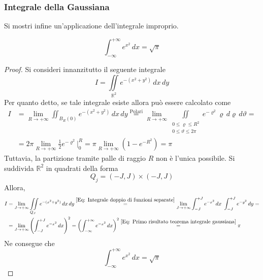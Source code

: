\subsubsection{Integrale della Gaussiana}
Si mostri infine un'applicazione dell'integrale improprio.
\begin{theorem}
    \begin{equation}
    \int_{-\infty}^{+\infty}{e^{x^2}}\, dx = \sqrt{\pi}
    \end{equation}
\end{theorem}
\begin{proof}
    Si consideri innanzitutto il seguente integrale
    \begin{equation}
        I=\iint\limits_{\mathbb{R}^2}{e^{-(x^2+y^2)}}\,dx\,dy
    \end{equation}
    Per quanto detto, se tale integrale esiste allora può essere calcolato come
    \begin{equation} \label{Eq: Primo risultato teorema integrale gaussiana}
    \begin{aligned}
        I&=\lim_{R \to +\infty}{\iint_{B_R(0)}{e^{-(x^2+y^2)}}}\,dx\,dy \overset{\text{Polari}}{=} \lim_{R \to +\infty}{\iint\limits_{\substack{0 \leq \varrho \leq R^2\\ 0 \leq \vartheta \leq 2\pi}}{e^{-\varrho^2} \varrho}\,d\varrho\,d\vartheta}=\\
        &= 2\pi \lim_{R \to +\infty}{\frac{1}{2}}{e^{-\varrho^2}\Big|_{0}^{R}}= \pi \lim_{R \to +\infty}{(1-e^{-R^2})}= \pi
    \end{aligned}
    \end{equation}
    Tuttavia, la partizione tramite palle di raggio $R$ non è l'unica possibile. Si suddivida $\mathbb{R}^2$ in quadrati della forma
    \begin{equation}
        Q_j=(-J,J) \times (-J, J)
    \end{equation}
    Allora, 
    \begin{equation}
    \begin{aligned}
        I&= \lim_{J \to +\infty}{\iint\limits_{Q_J}{e^{-(x^2+y^2)}}\,dx\,dy}\overset{\eqref{Eq: Integrale doppio di funzioni separate}}{=} \lim_{J \to +\infty}{\int_{-J}^{+J}{e^{-x^2}}\, dx\ \int_{-J}^{+J}{e^{-y^2}}\,dy}=\\
        &=\lim_{J \to + \infty}\left(\int_{-J}^{+J}{ e^{-x^2}}\,dx\right)^2 = \left(\int_{-\infty}^{+\infty}{ e^{-x^2}}\,dx\right)^2 \overset{\eqref{Eq: Primo risultato teorema integrale gaussiana}}{=} \pi
    \end{aligned}
    \end{equation}
    Ne consegue che
    \begin{equation}
        \int_{-\infty}^{+\infty}{e^{x^2}}\, dx = \sqrt{\pi}
    \end{equation}
\end{proof}